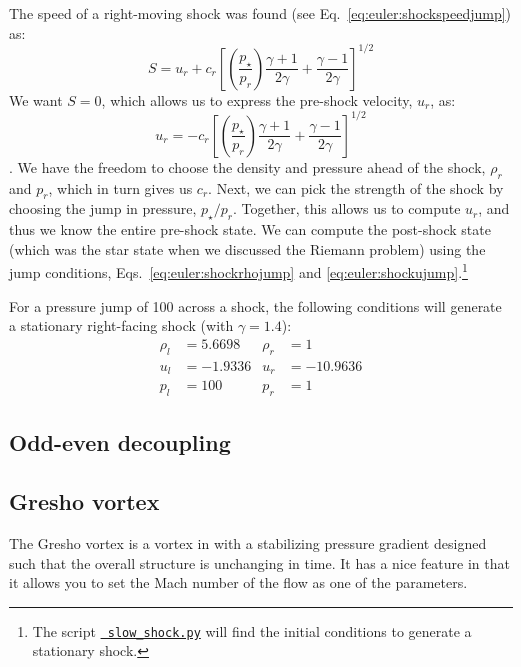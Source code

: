 The speed of a right-moving shock was found (see
Eq.~\ref{eq:euler:shockspeedjump}) as:
\begin{equation}
S = u_r + c_r \left [ \left ( \frac{p_\star}{p_r} \right ) \frac{\gamma+1}{2\gamma} + \frac{\gamma-1}{2\gamma} \right ]^{1/2}
\end{equation}
We want $S = 0$, which allows us to express the pre-shock velocity, $u_r$, as:
\begin{equation}
u_r = -c_r \left [ \left ( \frac{p_\star}{p_r} \right ) \frac{\gamma+1}{2\gamma} + \frac{\gamma-1}{2\gamma} \right ]^{1/2}
\end{equation}.
We have the freedom to choose the density and pressure ahead of the
shock, $\rho_r$ and $p_r$, which in turn gives us $c_r$.  Next, we can
pick the strength of the shock by choosing the jump in pressure,
$p_\star/p_r$.  Together, this allows us to compute $u_r$, and thus we
know the entire pre-shock state.  We can compute the post-shock state
(which was the star state when we discussed the Riemann problem) using
the jump conditions, Eqs.~\ref{eq:euler:shockrhojump} and
\ref{eq:euler:shockujump}.\footnote{The script
  \href{https://github.com/zingale/hydro_examples/blob/master/compressible/slow_shock.py}{\tt
    slow\_shock.py} will find the initial conditions to generate a
  stationary shock.}

For a pressure jump of 100 across a shock, the following conditions will
generate a stationary right-facing shock (with $\gamma = 1.4$):
\begin{align}
\rho_l &= 5.6698      &  \rho_r &= 1 \nonumber \\
u_l   &= -1.9336      &  u_r    &= -10.9636   \\
p_l    &= 100         &  p_r    &= 1 \nonumber
\end{align}


\subsection{Odd-even decoupling}

\subsection{Gresho vortex}

The Gresho vortex is a vortex in with a stabilizing pressure gradient
designed such that the overall structure is unchanging in time.  It
has a nice feature in that it allows you to set the Mach number of
the flow as one of the parameters.


